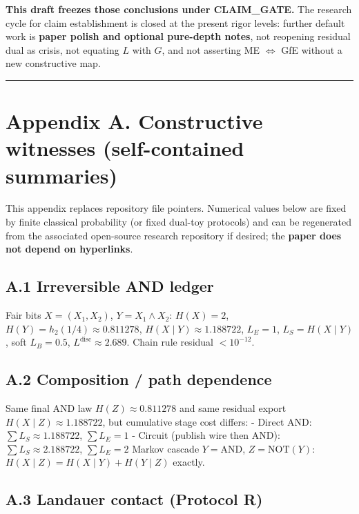\documentclass[
  11pt,
]{article}
\begin{document}
\textbf{This draft freezes those conclusions under CLAIM\_GATE.} The
research cycle for claim establishment is closed at the present rigor
levels: further default work is \textbf{paper polish and optional
pure-depth notes}, not reopening residual dual as crisis, not equating
\(L\) with \(G\), and not asserting ME \(\Leftrightarrow\) GfE without a
new constructive map.

\begin{center}\rule{0.5\linewidth}{0.5pt}\end{center}

\section{Appendix A. Constructive witnesses (self-contained
summaries)}\label{appendix-a.-constructive-witnesses-self-contained-summaries}

This appendix replaces repository file pointers. Numerical values below
are fixed by finite classical probability (or fixed dual-toy protocols)
and can be regenerated from the associated open-source research
repository if desired; the \textbf{paper does not depend on hyperlinks}.

\subsection{A.1 Irreversible AND
ledger}\label{a.1-irreversible-and-ledger}

Fair bits \(X=(X_1,X_2)\), \(Y=X_1\land X_2\): \(H(X)=2\),
\(H(Y)=h_2(1/4)\approx 0.811278\), \(H(X\mid Y)\approx 1.188722\),
\(L_E=1\), \(L_S=H(X\mid Y)\), soft \(L_B=0.5\),
\(L^{\mathrm{disc}}\approx 2.689\). Chain rule residual \(<10^{-12}\).

\subsection{A.2 Composition / path
dependence}\label{a.2-composition-path-dependence}

Same final AND law \(H(Z)\approx 0.811278\) and same residual export
\(H(X\mid Z)\approx 1.188722\), but cumulative stage cost differs: -
Direct AND: \(\sum L_S \approx 1.188722\), \(\sum L_E=1\) - Circuit
(publish wire then AND): \(\sum L_S \approx 2.188722\), \(\sum L_E=2\)
Markov cascade \(Y=\mathrm{AND}\), \(Z=\mathrm{NOT}(Y)\):
\(H(X\mid Z)=H(X\mid Y)+H(Y\mid Z)\) exactly.

\subsection{A.3 Landauer contact (Protocol
R)}\label{a.3-landauer-contact-protocol-r}
\end{document}
